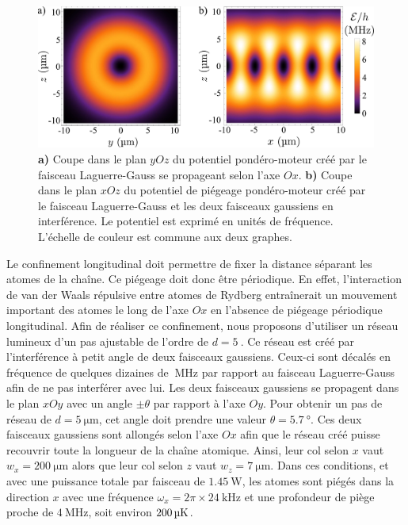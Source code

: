 \begin{figure}[h]
\centering
\includegraphics[width=\linewidth]{figures/circsim/pondero_trap}
\caption[Potentiel de piégeage pondéro-moteur]{
\textbf{a)} Coupe dans le plan $yOz$ du potentiel pondéro-moteur créé par le faisceau Laguerre-Gauss se propageant selon l'axe $Ox$.
\textbf{b)} Coupe dans le plan $xOz$ du potentiel de piégeage pondéro-moteur créé par le faisceau Laguerre-Gauss et les deux faisceaux gaussiens en interférence.
Le potentiel est exprimé en unités de fréquence. L'échelle de couleur est commune aux deux graphes.
}
\label{fig:pondero_trap}
\end{figure}
	
Le confinement longitudinal doit permettre de fixer la distance séparant les atomes de la chaîne.
Ce piégeage doit donc être périodique.
En effet, l'interaction de van der Waals répulsive entre atomes de Rydberg entraînerait un mouvement important des atomes le long de l'axe $Ox$ en l'absence de piégeage périodique longitudinal.
Afin de réaliser ce confinement, nous proposons d'utiliser un réseau lumineux d'un pas ajustable de l'ordre de $d=\SI{5}{}$.
Ce réseau est créé par l'interférence à petit angle de deux faisceaux gaussiens.
Ceux-ci sont décalés en fréquence de quelques dizaines de $\SI{}{\MHz}$ par rapport au faisceau Laguerre-Gauss afin de ne pas interférer avec lui.
Les deux faisceaux gaussiens se propagent dans le plan $xOy$ avec un angle $\pm \theta$ par rapport à l'axe $Oy$.
Pour obtenir un pas de réseau de $d=\SI{5}{\um}$, cet angle doit prendre une valeur $\theta=\SI{5.7}{\degree}$.
Ces deux faisceaux gaussiens sont allongés selon l'axe $Ox$ afin que le réseau créé puisse recouvrir toute la longueur de la chaîne atomique.
Ainsi, leur col selon $x$ vaut $w_x = \SI{200}{\um}$ alors que leur col selon $z$ vaut $w_z=\SI{7}{\um}$.
Dans ces conditions, et avec une puissance totale par faisceau de $\SI{1.45}{\watt}$, les atomes sont piégés dans la direction $x$ avec une fréquence $\omega_x = 2\pi \times \SI{24}{\kHz}$ et une profondeur de piège proche de $\SI{4}{\MHz}$, soit environ $\SI{200}{\si{\micro\kelvin}}$.

